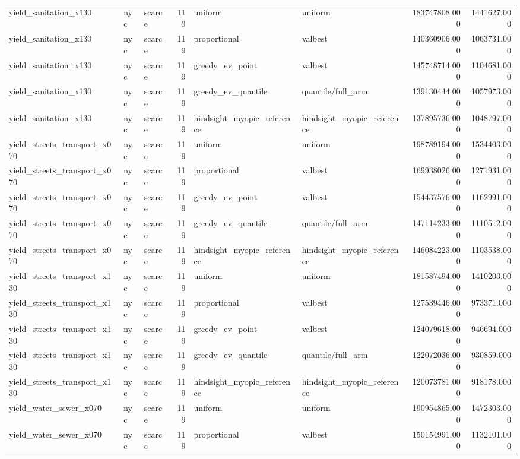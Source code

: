\begin{tabular}{lllrllrr}
yield\_sanitation\_x130 & nyc & scarce & 119 & uniform & uniform & 183747808.000 & 1441627.000 \\
yield\_sanitation\_x130 & nyc & scarce & 119 & proportional & valbest & 140360906.000 & 1063731.000 \\
yield\_sanitation\_x130 & nyc & scarce & 119 & greedy\_ev\_point & valbest & 145748714.000 & 1104681.000 \\
yield\_sanitation\_x130 & nyc & scarce & 119 & greedy\_ev\_quantile & quantile/full\_arm & 139130444.000 & 1057973.000 \\
yield\_sanitation\_x130 & nyc & scarce & 119 & hindsight\_myopic\_reference & hindsight\_myopic\_reference & 137895736.000 & 1048797.000 \\
yield\_streets\_transport\_x070 & nyc & scarce & 119 & uniform & uniform & 198789194.000 & 1534403.000 \\
yield\_streets\_transport\_x070 & nyc & scarce & 119 & proportional & valbest & 169938026.000 & 1271931.000 \\
yield\_streets\_transport\_x070 & nyc & scarce & 119 & greedy\_ev\_point & valbest & 154437576.000 & 1162991.000 \\
yield\_streets\_transport\_x070 & nyc & scarce & 119 & greedy\_ev\_quantile & quantile/full\_arm & 147114233.000 & 1110512.000 \\
yield\_streets\_transport\_x070 & nyc & scarce & 119 & hindsight\_myopic\_reference & hindsight\_myopic\_reference & 146084223.000 & 1103538.000 \\
yield\_streets\_transport\_x130 & nyc & scarce & 119 & uniform & uniform & 181587494.000 & 1410203.000 \\
yield\_streets\_transport\_x130 & nyc & scarce & 119 & proportional & valbest & 127539446.000 & 973371.000 \\
yield\_streets\_transport\_x130 & nyc & scarce & 119 & greedy\_ev\_point & valbest & 124079618.000 & 946694.000 \\
yield\_streets\_transport\_x130 & nyc & scarce & 119 & greedy\_ev\_quantile & quantile/full\_arm & 122072036.000 & 930859.000 \\
yield\_streets\_transport\_x130 & nyc & scarce & 119 & hindsight\_myopic\_reference & hindsight\_myopic\_reference & 120073781.000 & 918178.000 \\
yield\_water\_sewer\_x070 & nyc & scarce & 119 & uniform & uniform & 190954865.000 & 1472303.000 \\
yield\_water\_sewer\_x070 & nyc & scarce & 119 & proportional & valbest & 150154991.000 & 1132101.000 \\

\end{tabular}
